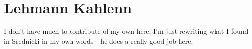 \documentclass[main.tex]{subfiles}
\begin{document}
\chapter{Lehmann Kahlenn}
I don't have much to contribute of my own here. I'm just rewriting what I found in Srednicki in my own words - he does a really good job here.
\end{document}
